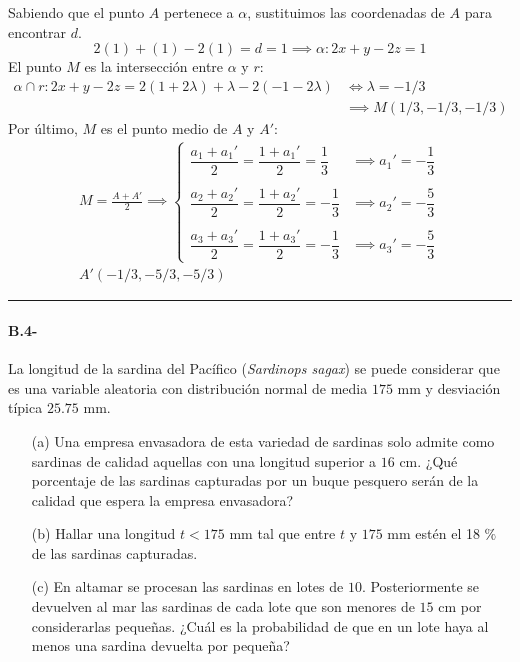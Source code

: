\begin{enumerate}
    Sabiendo que el punto $A$ pertenece a $\alpha $, sustituimos las coordenadas de $A$ para encontrar $d$. 
    $$
    2(1)+(1)-2(1)=d=1 \implies \alpha :2x+y-2z=1
    $$
    El punto $M$ es la intersección entre $\alpha $ y $r$: 
    \begin{equation*}
        \begin{split}
            \alpha \cap r: 2x+y-2z=2(1+2\lambda )+ \lambda -2(-1-2\lambda ) &\iff \lambda =-1/3\\
            &\implies M(1/3,-1/3,-1/3)
        \end{split}
    \end{equation*}
    Por último, $M$ es el punto medio de $A$ y $A'$: 
    \begin{equation*}
        \begin{split}
            M=\frac{A+A'}{2} \implies \begin{cases}
                \dfrac{a_1+a_1'}{2}=\dfrac{1+a_1'}{2}=\dfrac{1}{3}&\implies a_1'=-\dfrac{1}{3}\\\\
                \dfrac{a_2+a_2'}{2}=\dfrac{1+a_2'}{2}=-\dfrac{1}{3}&\implies a_2'=-\dfrac{5}{3}\\\\
                \dfrac{a_3+a_3'}{2}=\dfrac{1+a_3'}{2}=-\dfrac{1}{3}&\implies a_3'=-\dfrac{5}{3}
            \end{cases}\\
            \boxed{A'(-1/3,-5/3,-5/3)}
        \end{split}
    \end{equation*}
\end{enumerate}

\noindent\rule{\textwidth}{0.5pt}
\begin{mybox}
    \paragraph{B.4-} La longitud de la sardina del Pacífico (\textit{Sardinops sagax}) se puede considerar que es una variable aleatoria con
distribución normal de media $175$ mm y desviación típica $25.75$ mm.
\begin{enumerate}
    \item[(a)] Una empresa envasadora de esta variedad de sardinas solo admite como sardinas de calidad
aquellas con una longitud superior a $16$ cm. ¿Qué porcentaje de las sardinas capturadas por un buque 
pesquero serán de la calidad que espera la empresa envasadora?  

\item[(b)] Hallar una longitud $t < 175$ mm tal que entre $t$ y $175$ mm estén el 18 $\%$ de las sardinas capturadas. 
\item[(c)]  En altamar se procesan las sardinas en lotes de $10$. Posteriormente se devuelven al mar las
sardinas de cada lote que son menores de $15$ cm por considerarlas pequeñas. ¿Cuál es la probabilidad de
que en un lote haya al menos una sardina devuelta por pequeña?  
\end{enumerate}
\end{mybox}
